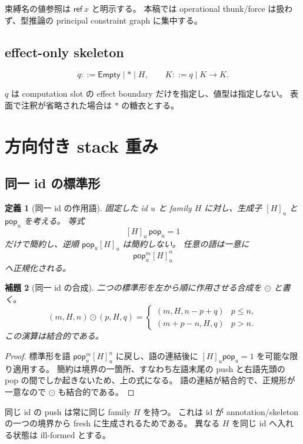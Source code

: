 \documentclass[uplatex,dvipdfmx,a4paper,10.5pt]{jsarticle}
\theoremstyle{jpplain}
\newtheorem{definition}{定義}[section]
\newtheorem{lemma}[definition]{補題}
\newcommand{\Empty}{\mathsf{Empty}}
\newcommand{\takeop}[2]{[#1]_{#2}}
\newcommand{\popop}[1]{\mathsf{pop}_{#1}}
\newcommand{\kw}[1]{\mathsf{#1}}
\begin{document}
束縛名の値参照は $\kw{ref}\ x$ と明示する。
本稿では operational thunk/force は扱わず、型推論の principal constraint graph に集中する。

\subsection{effect-only skeleton}

\[
  q ::= \Empty \mid \ast \mid H,
  \qquad
  K ::= q \mid K\to K.
\]

$q$ は computation slot の effect boundary だけを指定し、値型は指定しない。
表面で注釈が省略された場合は $\ast$ の糖衣とする。

\section{方向付き stack 重み}

\subsection{同一 id の標準形}

\begin{definition}[同一 id の作用語]
固定した id $u$ と family $H$ に対し、生成子 $\takeop{H}{u}$ と $\popop{u}$ を考える。
等式
\[
  \takeop{H}{u}\,\popop{u}=1
\]
だけで簡約し、逆順 $\popop{u}\takeop{H}{u}$ は簡約しない。
任意の語は一意に
\[
  \popop{u}^{m}\takeop{H}{u}^{n}
\]
へ正規化される。
\end{definition}

\begin{lemma}[同一 id の合成]
二つの標準形を左から順に作用させる合成を $\odot$ と書く。
\[
(m,H,n)\odot(p,H,q)=
\begin{cases}
(m,H,n-p+q) & p\le n,\\
(m+p-n,H,q) & p>n.
\end{cases}
\]
この演算は結合的である。
\end{lemma}

\begin{proof}
標準形を語 $\popop{u}^{m}\takeop{H}{u}^{n}$ に戻し、語の連結後に
$\takeop{H}{u}\popop{u}=1$ を可能な限り適用する。
簡約は境界の一箇所、すなわち左語末尾の push と右語先頭の pop の間でしか起きないため、上の式になる。
語の連結が結合的で、正規形が一意なので $\odot$ も結合的である。
\end{proof}

同じ id の push は常に同じ family $H$ を持つ。
これは id が annotation/skeleton の一つの境界から fresh に生成されるためである。
異なる $H$ を同じ id へ入れる状態は ill-formed とする。
\end{document}
